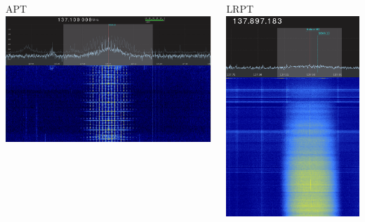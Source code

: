 \documentclass[]{beamer}
\begin{document}
\begin{frame}
    \begin{columns}[T]
        \begin{column}[T]{5cm}
            APT
            \includegraphics[width=0.45\paperwidth,height=0.7\paperheight,keepaspectratio]{images/apt-gqrx.png}
        \end{column}
        \begin{column}[T]{5cm}
            LRPT
            \includegraphics[width=0.45\paperwidth,height=0.7\paperheight,keepaspectratio]{images/lrpt-gqrx.png}
        \end{column}
    \end{columns}
\end{frame}
\end{document}
